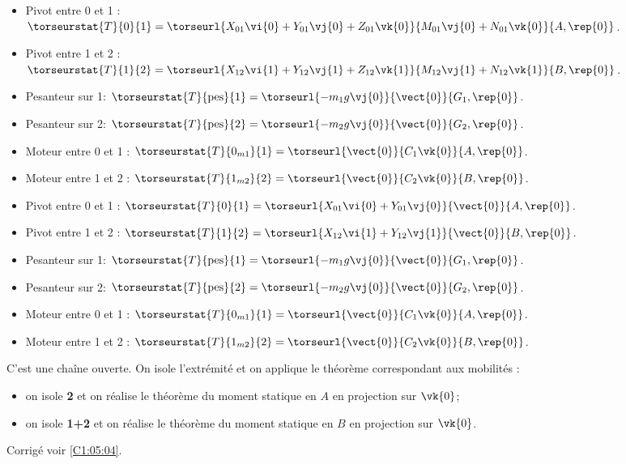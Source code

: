 \ifprof
\begin{itemize}
\item Pivot entre 0 et 1 : $\torseurstat{T}{0}{1}=\torseurl{X_{01}\vi{0}+Y_{01}\vj{0}+Z_{01}\vk{0}}{M_{01}\vj{0}+N_{01}\vk{0}}{A,\rep{0}}$.
\item Pivot entre 1 et 2 : $\torseurstat{T}{1}{2}=\torseurl{X_{12}\vi{1}+Y_{12}\vj{1}+Z_{12}\vk{1}}{M_{12}\vj{1}+N_{12}\vk{1}}{B,\rep{0}}$.
\item Pesanteur sur 1: $\torseurstat{T}{\text{pes}}{1}=\torseurl{-m_1g\vj{0}}{\vect{0}}{G_1,\rep{0}}$.
\item Pesanteur sur 2: $\torseurstat{T}{\text{pes}}{2}=\torseurl{-m_2g\vj{0}}{\vect{0}}{G_2,\rep{0}}$.
\item Moteur entre 0 et 1 : $\torseurstat{T}{0_{m1}}{1}=\torseurl{\vect{0}}{C_1\vk{0}}{A,\rep{0}}$.
\item Moteur entre 1 et 2 : $\torseurstat{T}{1_{m2}}{2}=\torseurl{\vect{0}}{C_2\vk{0}}{B,\rep{0}}$.
\end{itemize}
\else
\fi

\ifprof
\begin{itemize}
\item Pivot entre 0 et 1 : $\torseurstat{T}{0}{1}=\torseurl{X_{01}\vi{0}+Y_{01}\vj{0}}{\vect{0}}{A,\rep{0}}$.
\item Pivot entre 1 et 2 : $\torseurstat{T}{1}{2}=\torseurl{X_{12}\vi{1}+Y_{12}\vj{1}}{\vect{0}}{B,\rep{0}}$.
\item Pesanteur sur 1: $\torseurstat{T}{\text{pes}}{1}=\torseurl{-m_1g\vj{0}}{\vect{0}}{G_1,\rep{0}}$.
\item Pesanteur sur 2: $\torseurstat{T}{\text{pes}}{2}=\torseurl{-m_2g\vj{0}}{\vect{0}}{G_2,\rep{0}}$.
\item Moteur entre 0 et 1 : $\torseurstat{T}{0_{m1}}{1}=\torseurl{\vect{0}}{C_1\vk{0}}{A,\rep{0}}$.
\item Moteur entre 1 et 2 : $\torseurstat{T}{1_{m2}}{2}=\torseurl{\vect{0}}{C_2\vk{0}}{B,\rep{0}}$.
\end{itemize}
\else
\fi

\ifprof
C'est une chaîne ouverte. On isole l'extrémité et on applique le théorème correspondant aux mobilités : 
\begin{itemize}
\item on isole \textbf{2} et on réalise le théorème du moment statique en $A$ en projection sur $\vk{0}$;
\item on isole \textbf{1+2} et on réalise le théorème du moment statique en $B$ en projection sur $\vk{0}$.
\end{itemize}
\else
\fi



\ifprof
\else
\begin{flushright}
\footnotesize{Corrigé  voir \ref{C1:05:04}.}
\end{flushright}%
\fi